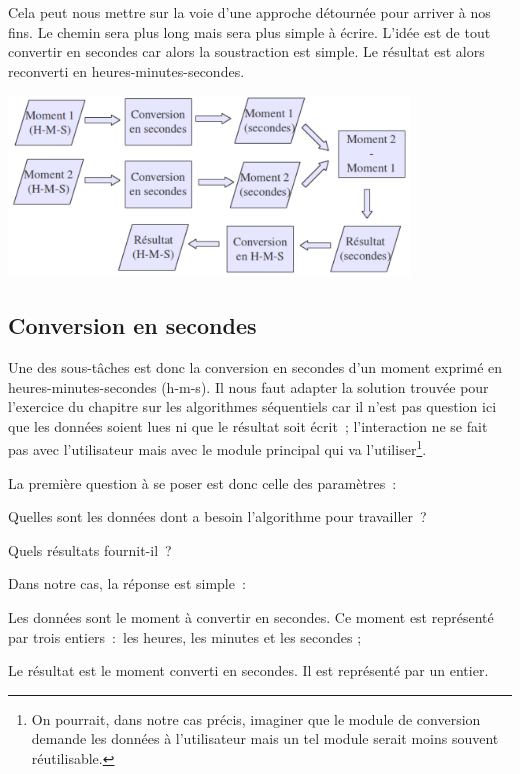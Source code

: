 	Cela peut nous mettre sur la voie d’une approche
	détournée pour arriver à nos fins. Le chemin sera plus long mais sera
	plus simple à écrire. L’idée est de tout convertir en
	secondes car alors la soustraction est simple. Le résultat est alors
	reconverti en heures-minutes-secondes.

	\begin{center}
	\includegraphics[width=0.8\textwidth]{image/module-conversion}
	\end{center}

\subsection*{Conversion en secondes}

	Une des sous-tâches est donc la conversion en secondes
	d’un moment exprimé en heures-minutes-secondes
	(h-m-s). Il nous faut adapter la solution trouvée pour
	l’exercice du chapitre sur les algorithmes séquentiels
	car il n’est pas question ici que les données soient
	lues ni que le résultat soit écrit~; l’interaction ne
	se fait pas avec l’utilisateur mais avec le module
	principal qui va l’utiliser\footnote{On pourrait,
	dans notre cas précis, imaginer que le module de conversion demande les
	données à l’utilisateur mais un tel module serait
	moins souvent réutilisable.}.

	La première question à se poser est donc celle des paramètres~:

	\begin{liste}
	\item 
		Quelles sont les données dont a besoin l’algorithme
		pour travailler~?
	\item 
		Quels résultats fournit-il~?
	\end{liste}

	Dans notre cas, la réponse est simple~:

	\begin{liste}
	\item {
		Les données sont le moment à convertir en secondes. Ce moment est
		représenté par trois entiers~:~les heures, les minutes et les secondes
		;}
	\item {
		Le résultat est le moment converti en secondes. Il est représenté par un
		entier.}
	\end{liste}

